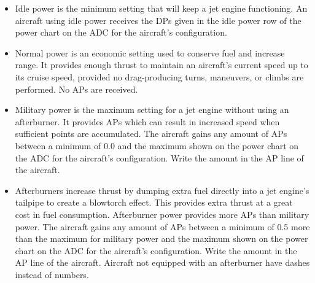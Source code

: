 \begin{itemize}
    \item{} Idle power is the minimum setting that will keep a jet engine functioning. An aircraft using idle power receives the DPs given in the idle power row of the power chart on the ADC for the aircraft's configuration.


    \item{} Normal power is an economic setting used to conserve fuel and increase range. It provides enough thrust to maintain an aircraft's current speed up to its cruise speed, provided no drag-producing turns, maneuvers, or climbs are performed. No APs are received.

    \item{} Military power is the maximum setting for a jet engine without using an afterburner. It provides APs which can result in increased speed when sufficient points are accumulated. The aircraft gains any amount of APs between a minimum of 0.0 and the maximum shown on the power chart on the ADC for the aircraft's configuration. Write the amount in the AP line of the aircraft.

    \item{} Afterburners increase thrust by dumping extra fuel directly into a jet engine's tailpipe to create a blowtorch effect. This provides extra thrust at a great cost in fuel consumption. Afterburner power provides more APs than military power. The aircraft gains any amount of APs between a minimum of 0.5 more than the maximum for military power and the maximum shown on the power chart on the ADC for the aircraft's configuration. Write the amount in the AP line of the aircraft. Aircraft not equipped with an afterburner have dashes instead of numbers.

\end{itemize}


